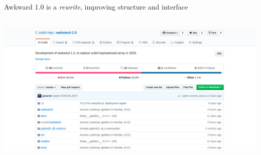 \documentclass[aspectratio=169]{beamer}
\begin{document}
\begin{frame}{Awkward 1.0 is a {\it rewrite}, improving structure and interface}
\vspace{0.2 cm}
\begin{columns}
\includegraphics[width=\linewidth]{awkward-1-github.png}
\end{columns}
\end{frame}
\end{document}
